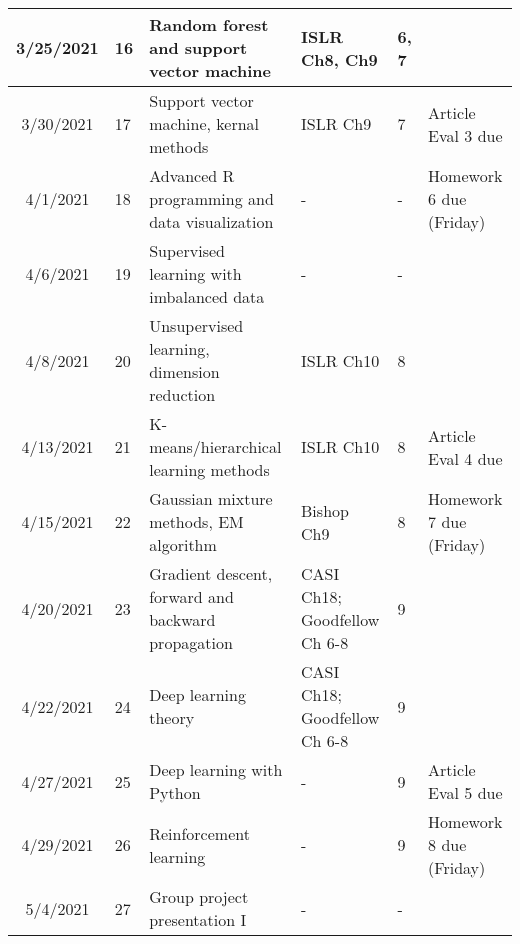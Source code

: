 \documentclass[11pt]{article}
\begin{document}
\begin{center}
\begin{tabular}{c|m{3em}|m{21em}|m{7em}|m{3em}|m{8em}}
3/25/2021 & 16 & Random forest and support vector machine & ISLR Ch8, Ch9 &  6, 7 &  \\ \hline
3/30/2021 & 17 & Support vector machine, kernal methods & ISLR Ch9 & 7 & Article Eval 3 due\\ \hline
4/1/2021 & 18 & Advanced R programming and data visualization & - & - & Homework 6 due (Friday)\\ \hline
4/6/2021 & 19 & Supervised learning with imbalanced data & - & - & \\ \hline
4/8/2021 & 20 & Unsupervised learning, dimension reduction & ISLR Ch10 & 8 &  \\ \hline
4/13/2021 & 21 & K-means/hierarchical learning methods & ISLR Ch10 & 8 & Article Eval 4 due\\ \hline
4/15/2021 & 22 & Gaussian mixture methods, EM algorithm & Bishop Ch9 & 8 & Homework 7 due (Friday) \\ \hline
4/20/2021 & 23 & Gradient descent, forward and backward propagation & CASI Ch18; Goodfellow Ch 6-8 & 9 & \\ \hline
4/22/2021 & 24 & Deep learning theory & CASI Ch18; Goodfellow Ch 6-8 & 9 & \\ \hline
4/27/2021 & 25 & Deep learning with Python & - & 9 & Article Eval 5 due\\ \hline
4/29/2021 & 26 & Reinforcement learning & - & 9 & Homework 8 due (Friday)\\ \hline
5/4/2021 & 27 & Group project presentation I & - & - & 
\end{tabular}
\end{center}
\end{document}
